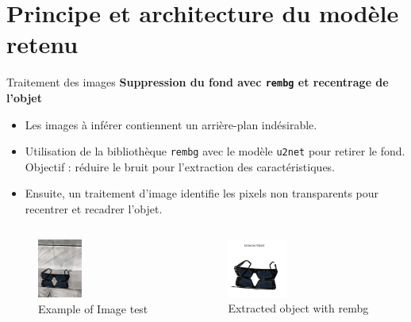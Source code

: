\documentclass{beamer}
\begin{document}
\section{Principe et architecture du modèle retenu}
\begin{frame}{Traitement des images}
    \footnotesize
    \textbf{Suppression du fond avec \texttt{rembg} et recentrage de l'objet}
    \begin{itemize}
        \item Les images à inférer contiennent un arrière-plan indésirable.
        \item Utilisation de la bibliothèque \texttt{rembg} avec le modèle \texttt{u2net} pour retirer le fond. Objectif : réduire le bruit pour l'extraction des caractéristiques. 
        \item Ensuite, un traitement d’image identifie les pixels non transparents pour recentrer et recadrer l’objet.
    \end{itemize}
    \begin{columns}
        \begin{figure}
            \includegraphics[width=0.4\textwidth]{assets/IMG_6883.jpg}
            \caption{Example of Image test}
        \end{figure}
        \begin{figure}
            \includegraphics[width=0.4\textwidth]{assets/glasses_rembg.png}
            \caption{Extracted object with rembg}
        \end{figure}
    \end{columns}
\end{frame}
\end{document}
